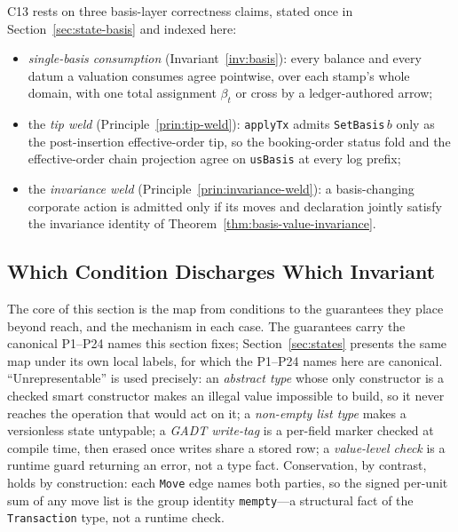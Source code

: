 \documentclass[11pt,a4paper]{article}
\begin{document}
C13 rests on three basis-layer correctness claims, stated once in Section~\ref{sec:state-basis} and indexed here:
\begin{itemize}[nosep]
\item \emph{single-basis consumption} (Invariant~\ref{inv:basis}): every balance and every datum a valuation consumes agree pointwise, over each stamp's whole domain, with one total assignment $\beta_t$ or cross by a ledger-authored arrow;
\item the \emph{tip weld} (Principle~\ref{prin:tip-weld}): \texttt{applyTx} admits \texttt{SetBasis}\,$b$ only as the post-insertion effective-order tip, so the booking-order status fold and the effective-order chain projection agree on \texttt{usBasis} at every log prefix;
\item the \emph{invariance weld} (Principle~\ref{prin:invariance-weld}): a basis-changing corporate action is admitted only if its moves and declaration jointly satisfy the invariance identity of Theorem~\ref{thm:basis-value-invariance}.
\end{itemize}

\subsection{Which Condition Discharges Which Invariant}
\label{sec:invariants-discharge}

The core of this section is the map from conditions to the guarantees they place beyond reach, and the mechanism in each case. The guarantees carry the canonical P1--P24 names this section fixes; Section~\ref{sec:states} presents the same map under its own local labels, for which the P1--P24 names here are canonical. ``Unrepresentable'' is used precisely: an \emph{abstract type} whose only constructor is a checked smart constructor makes an illegal value impossible to build, so it never reaches the operation that would act on it; a \emph{non-empty list type} makes a versionless state untypable; a \emph{GADT write-tag} is a per-field marker checked at compile time, then erased once writes share a stored row; a \emph{value-level check} is a runtime guard returning an error, not a type fact. Conservation, by contrast, holds by construction: each \texttt{Move} edge names both parties, so the signed per-unit sum of any move list is the group identity \texttt{mempty}---a structural fact of the \texttt{Transaction} type, not a runtime check.
\end{document}
